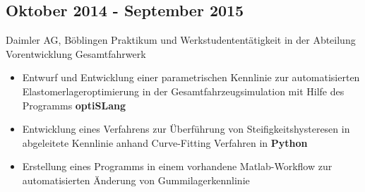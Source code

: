 \documentclass{mycv}
\begin{document}
\begin{paracol}{2}
\subsection{Oktober 2014 - September 2015}{Daimler AG, B{\"o}blingen}
{Praktikum und Werkstudentent{\"a}tigkeit in der Abteilung Vorentwicklung
Gesamtfahrwerk}
	  \begin{itemize}
			\item Entwurf und Entwicklung einer parametrischen Kennlinie zur
				automatisierten Elastomerlageroptimierung in der
				Gesamtfahrzeugsimulation mit Hilfe des Programms {\bfseries
				optiSLang}
			\item Entwicklung eines Verfahrens zur {\"U}berf{\"u}hrung von
				Steifigkeitshysteresen in abgeleitete Kennlinie anhand Curve-Fitting
				Verfahren in {\bfseries Python}
			\item Erstellung eines Programms in einem vorhandene Matlab-Workflow zur
				automatisierten {\"A}nderung von Gummilagerkennlinie\\
		\end{itemize}
\end{paracol}
\end{document}

